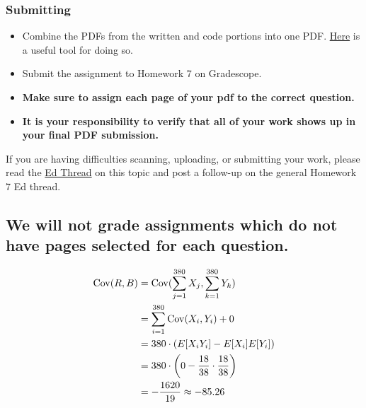 \documentclass[11pt]{article}
\providecommand{\tightlist}{%
      \setlength{\itemsep}{0pt}\setlength{\parskip}{0pt}}
\begin{document}
\subsubsection{Submitting}\label{submitting}

\begin{itemize}
\tightlist
\item
  Combine the PDFs from the written and code portions into one PDF.
  \href{https://smallpdf.com/merge-pdf}{Here} is a useful tool for doing
  so.
\item
  Submit the assignment to Homework 7 on Gradescope.
\item
  \textbf{Make sure to assign each page of your pdf to the correct
  question.}
\item
  \textbf{It is your responsibility to verify that all of your work
  shows up in your final PDF submission.}
\end{itemize}

If you are having difficulties scanning, uploading, or submitting your
work, please read the
\href{https://edstem.org/us/courses/94054/discussion/7533569}{Ed Thread}
on this topic and post a follow-up on the general Homework 7 Ed thread.

    \subsection{\texorpdfstring{\textbf{We will not grade assignments which
do not have pages selected for each
question.}}{We will not grade assignments which do not have pages selected for each question.}}\label{we-will-not-grade-assignments-which-do-not-have-pages-selected-for-each-question.}


    
    
   







\begin{align*}
	\operatorname{Cov}(R, B) &= \operatorname{Cov}(\sum_{j=1}^{380}X_{j}, \sum_{k=1}^{380}Y_{k}) \\
	&= \sum_{i=1}^{380}\operatorname{Cov}(X_{i}, Y_i) + 0\\
	&= 380 \cdot \left( E[X_iY_i] - E[X_i]E[Y_i] \right)  \\
	&= 380 \cdot \left( 0 - \frac{18}{38} \cdot \frac{18}{38} \right)  \\
	&= -\frac{1620}{19} \approx -85.26 \\
\end{align*}
\end{document}
